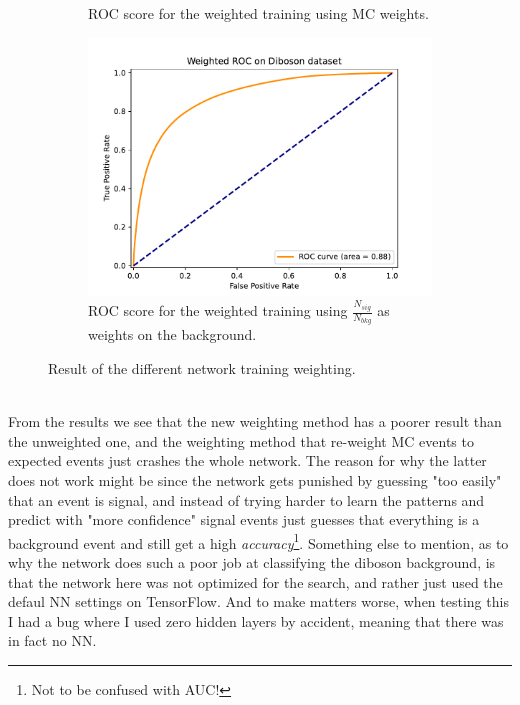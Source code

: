 \documentclass[14pt, a4paper]{book}
\begin{document}
\begin{figure}[!ht]
\begin{subfigure}[b]{0.49\textwidth}
        \caption{ROC score for the weighted training using MC weights.}\label{fig:DibosonROCMC}
     \end{subfigure}
     \begin{subfigure}[b]{0.49\textwidth}
        \centering
        \includegraphics[width=1\textwidth]{ROC_w.pdf}
        \caption{ROC score for the weighted training using $\frac{N_{sig}}{N_{bkg}}$ as weights on the background.}\label{fig:DibosonROCW}
     \end{subfigure}
	\caption{Result of the different network training weighting.}\label{fig:DibosonROC}
\end{figure}
\\From the results we see that the new weighting method has a poorer result than the unweighted one, and the weighting method that re-weight MC events to expected events just crashes the whole network. 
The reason for why the latter does not work might be since the network gets punished by guessing "too easily" that an event is signal, and instead of trying harder to learn the patterns and predict with "more confidence" 
signal events just guesses that everything is a background event and still get a high \textit{accuracy}\footnote{Not to be confused with AUC!}. Something else to mention, as to why the network does such a poor job at classifying the diboson background, is that the network here was not optimized for the search, and rather just used the 
defaul NN settings on TensorFlow. And to make matters worse, when testing this I had a bug where I used zero hidden layers by accident, meaning that there was in fact no NN.
\end{document}
